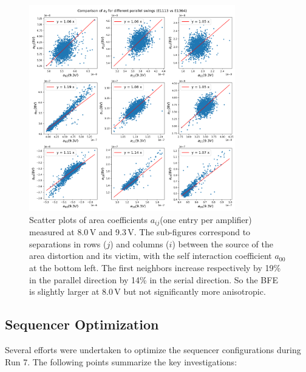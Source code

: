 \begin{figure}
\begin{centering}
\includegraphics[width=0.8\textwidth]{figures/aScatterPlots8vs9-3.png}
\end{centering}
\caption{Scatter plots of area coefficients $a_{ij}$(one entry per amplifier)
measured at 8.0\,V and 9.3\,V. The sub-figures correspond to separations in rows ($j$) and columns ($i$)
between the source of the area distortion and its victim, with the self
interaction coefficient $a_{00}$ at the bottom left. The first neighbors increase
respectively by 19\% in the parallel direction by 14\% in the serial
direction. So the BFE is slightly larger at 8.0\,V but not significantly
more anisotropic.}
\label{fig:area-coeffs}
\end{figure}


\subsection{Sequencer Optimization}\label{sequencer-optimization}



Several efforts were undertaken to optimize the sequencer configurations during Run 7. The following points summarize the key investigations:

